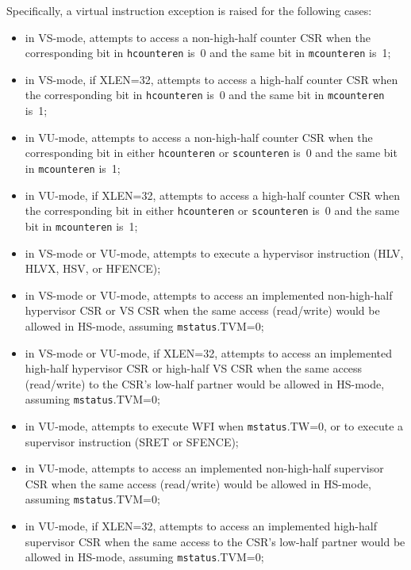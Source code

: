 Specifically, a virtual instruction exception is raised for the
following cases:
\begin{itemize}

\item
in VS-mode,
attempts to access a non-high-half counter CSR when the corresponding bit in
{\tt hcounteren} is~0 and the same bit in {\tt mcounteren} is~1;

\item
in VS-mode, if XLEN=32, attempts to access a high-half
counter CSR when the corresponding bit in {\tt hcounteren} is~0 and the
same bit in {\tt mcounteren} is~1;

\item
in VU-mode, attempts to access a non-high-half counter CSR when the
corresponding bit in either {\tt hcounteren} or {\tt scounteren} is~0
and the same bit in {\tt mcounteren} is~1;

\item
in VU-mode, if XLEN=32, attempts to access a high-half counter CSR when
the corresponding bit in either {\tt hcounteren} or {\tt scounteren}
is~0 and the same bit in {\tt mcounteren} is~1;

\item
in VS-mode or VU-mode,
attempts to execute a hypervisor instruction (HLV, HLVX, HSV, or HFENCE);

\item
in VS-mode or VU-mode, attempts to access an implemented non-high-half
hypervisor CSR or VS CSR when the same access (read/write) would be
allowed in HS-mode, assuming {\tt mstatus}.TVM=0;

\item
in VS-mode or VU-mode, if XLEN=32, attempts to access an implemented
high-half hypervisor CSR or high-half VS CSR when the same access
(read/write) to the CSR's low-half partner would be allowed in HS-mode,
assuming {\tt mstatus}.TVM=0;

\item
in VU-mode, attempts to execute WFI when {\tt mstatus}.TW=0, or to
execute a supervisor instruction (SRET or SFENCE);

\item
in VU-mode, attempts to access an implemented non-high-half supervisor
CSR when the same access (read/write) would be allowed in HS-mode,
assuming {\tt mstatus}.TVM=0;

\item
in VU-mode, if XLEN=32, attempts to access an implemented high-half
supervisor CSR when the same access to the CSR's low-half partner would
be allowed in HS-mode, assuming {\tt mstatus}.TVM=0;


\end{itemize}
